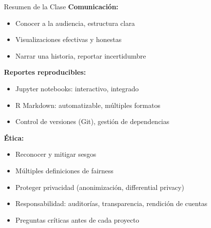 \documentclass[aspectratio=169]{beamer}
\begin{document}
\begin{frame}{Resumen de la Clase}
\textbf{Comunicación:}
\begin{itemize}
\item Conocer a la audiencia, estructura clara
\item Visualizaciones efectivas y honestas
\item Narrar una historia, reportar incertidumbre
\end{itemize}

\vspace{0.3cm}

\textbf{Reportes reproducibles:}
\begin{itemize}
\item Jupyter notebooks: interactivo, integrado
\item R Markdown: automatizable, múltiples formatos
\item Control de versiones (Git), gestión de dependencias
\end{itemize}

\vspace{0.3cm}

\textbf{Ética:}
\begin{itemize}
\item Reconocer y mitigar sesgos
\item Múltiples definiciones de fairness
\item Proteger privacidad (anonimización, differential privacy)
\item Responsabilidad: auditorías, transparencia, rendición de cuentas
\item Preguntas críticas antes de cada proyecto
\end{itemize}
\end{frame}
\end{document}
